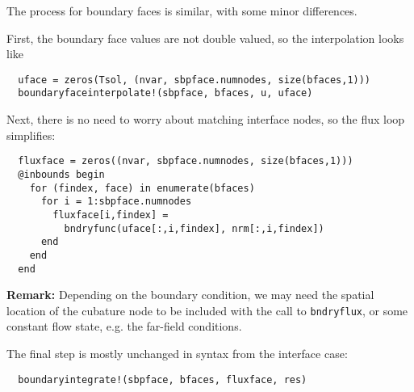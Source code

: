 \documentclass[11pt]{article} %
\makeatletter
\newcommand{\eg}[0]{{e.g.\@}\xspace}
\makeatother
\begin{document}
The process for boundary faces is similar, with some minor differences.

First, the boundary face values are not double valued, so the interpolation
looks like
\begin{lstlisting}
  uface = zeros(Tsol, (nvar, sbpface.numnodes, size(bfaces,1)))
  boundaryfaceinterpolate!(sbpface, bfaces, u, uface)
\end{lstlisting}

Next, there is no need to worry about matching interface nodes, so the flux
loop simplifies:
\begin{lstlisting}
  fluxface = zeros((nvar, sbpface.numnodes, size(bfaces,1)))
  @inbounds begin
    for (findex, face) in enumerate(bfaces)
      for i = 1:sbpface.numnodes
        fluxface[i,findex] =
          bndryfunc(uface[:,i,findex], nrm[:,i,findex])
      end
    end
  end
\end{lstlisting}

\noindent\textbf{Remark:} Depending on the boundary condition, we may need the
spatial location of the cubature node to be included with the call to
\texttt{bndryflux}, or some constant flow state, \eg the far-field conditions.

The final step is mostly unchanged in syntax from the interface case:
\begin{lstlisting}
  boundaryintegrate!(sbpface, bfaces, fluxface, res)
\end{lstlisting}
\end{document}
